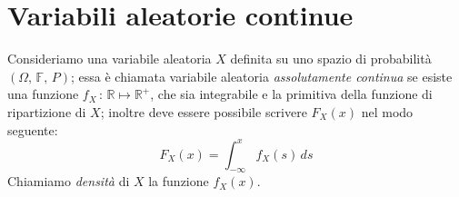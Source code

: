     \section{Variabili aleatorie continue}
        \begin{defn}\label{defn:Variabile_aleatoria_continua}
            Consideriamo una variabile aleatoria $X$ definita su uno spazio di probabilità $(\Omega,\,\mathbb{F},\,P)$; essa è chiamata variabile aleatoria \textit{assolutamente continua} se esiste una funzione $f_X\,:\, \mathbb{R} \mapsto \mathbb{R^+}$, che sia integrabile e la primitiva della funzione di ripartizione di $X$; inoltre deve essere possibile scrivere $F_X(x)$ nel modo seguente:
            \begin{equation}
                F_X(x) = \int_{-\infty}^{x} f_X(s)\, ds 
            \end{equation}
            Chiamiamo \textit{densità} di $X$ la funzione $f_X(x)$.
        \end{defn}

